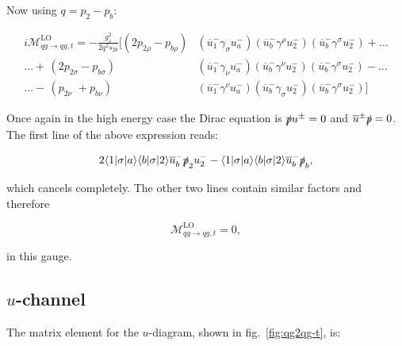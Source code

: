 			Now using $q=p_2-p_b$:

			\begin{align*}
			i\mathcal{M}_{qg\rightarrow qg, t}^{\text{LO}} = -\frac{g_s^2}{2q^2s_{2b}}[(2p_{2\rho}-p_{b\rho})&\left(\overline{u}^-_1\gamma_{\sigma}u^-_a\right)\left(\overline{u}^-_b\gamma^{\rho}u^-_2\right)\left(\overline{u}^-_b\gamma^{\sigma}u^-_2\right)+\ldots \\
			\ldots + \hspace{2pt} (2p_{2\sigma}-p_{b\sigma})&\left(\overline{u}^-_1\gamma_{\nu}u^-_a\right)\left(\overline{u}^-_b\gamma^{\nu}u^-_2\right)\left(\overline{u}^-_b\gamma^{\sigma}u^-_2\right)-\ldots \\
			\ldots - \hspace{2pt} (p_{2\nu}\hspace{4pt}+p_{b\nu})&\left(\overline{u}^-_1\gamma^{\nu}u^-_a\right)\left(\overline{u}^-_b\gamma_{\sigma}u^-_2\right)\left(\overline{u}^-_b\gamma^{\sigma}u^-_2\right)]
			\end{align*}

			Once again in the high energy case the Dirac equation is $\slashed pu^\pm=0$ and $\overline{u}^\pm\slashed p=0$.  The first line of the above expression reads:

			\begin{equation}
			2\langle1|\sigma|a\rangle\langle b|\sigma|2\rangle\overline{u}^-_b\slashed p_2u^-_2 - \langle1|\sigma|a\rangle\langle b|\sigma|2\rangle\overline{u}^-_b\slashed p_b,
			\end{equation}

			which cancels completely.  The other two lines contain similar factors and therefore

			\begin{equation}
				\mathcal{M}_{qg\rightarrow qg, t}^{\text{LO}}=0,
				\label{eqn:t-channel}
			\end{equation}

			in this gauge.

		\subsection{$u$-channel}

			The matrix element for the $u$-diagram, shown in fig.~\eqref{fig:qg2qg-t}, is:

